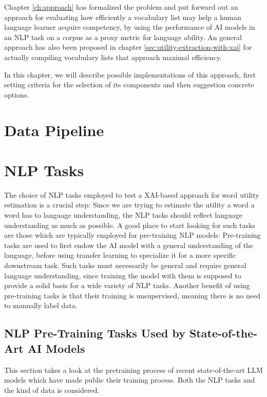 Chapter \ref{ch:approach} has formalized the problem and put forward out an approach for evaluating how efficiently a vocabulary list may help a human language learner acquire competency, by using the performance of AI models in an NLP task on a corpus as a proxy metric for language ability.
An general approach has also been proposed in chapter \ref{sec:utility-extraction-with-xai} for actually compiling vocabulary lists that approach maximal efficiency.

In this chapter, we will describe possible implementations of this approach, first setting criteria for the selection of its components and then suggestion concrete options.


\section{Data Pipeline}


\section{NLP Tasks}
The choice of NLP tasks employed to test a XAI-based approach for word utility estimation is a crucial step:
Since we are trying to estimate the utility a word a word has to language understanding, the NLP tasks should reflect language understanding as much as possible.
A good place to start looking for such tasks are those which are typically employed for pre-training NLP models:
Pre-training tasks are used to first endow the AI model with a general understanding of the language, before using transfer learning to specialize it for a more specific downstream task.
Such tasks must necessarily be general and require general language understanding, since training the model with them is supposed to provide a solid basis for a wide variety of NLP tasks.
Another benefit of using pre-training tasks is that their training is unsupervised, meaning there is no need to manually label data.

\subsection{NLP Pre-Training Tasks Used by State-of-the-Art AI Models}
This section takes a look at the pretraining process of recent state-of-the-art LLM models which have made public their training process.
Both the NLP tasks and the kind of data is considered.


